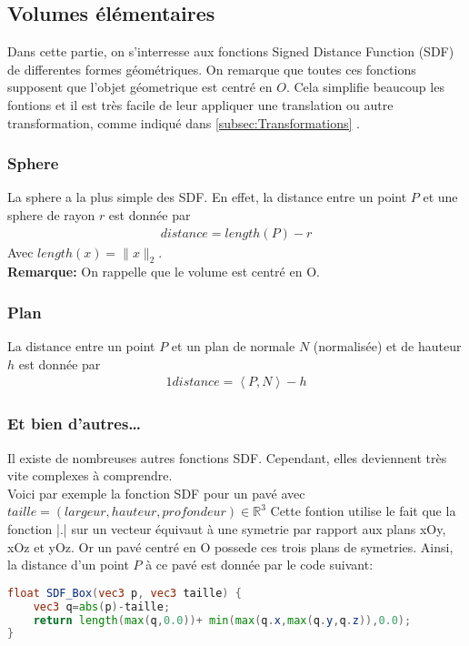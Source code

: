 \subsection{Volumes élémentaires}
Dans cette partie, on s'interresse aux fonctions Signed Distance Function (SDF) de differentes formes géométriques. On remarque que toutes ces fonctions supposent que l'objet géometrique est centré en $O$. Cela simplifie beaucoup les fontions et il est très facile de leur appliquer une translation ou autre transformation, comme indiqué dans \ref{subsec:Transformations} .
\subsubsection{Sphere}
La sphere a la plus simple des SDF. En effet, la distance entre un point $P$ et une sphere de rayon $r$ est donnée par 
\begin{align*}
distance=length(P)-r
\end{align*}
Avec $length(x)=\|x\|_2$.
\\\textbf{Remarque:} On rappelle que le volume est centré en O.
\subsubsection{Plan}
La distance entre un point $P$ et un plan de normale $N$ (normalisée) et de hauteur $h$ est donnée par 
\begin{alignat*}{1}
    distance=\left\langle P,N \right\rangle - h
\end{alignat*}
\subsubsection{Et bien d'autres\ldots}
Il existe de nombreuses autres fonctions SDF. Cependant, elles deviennent très vite complexes à comprendre.\\
Voici par exemple la fonction SDF pour un pavé avec $taille=(largeur, hauteur, profondeur) \in \mathbb{R}^3$
Cette fontion utilise le fait que la fonction |.| sur un vecteur équivaut à une symetrie par rapport aux plans xOy, xOz et yOz. Or un pavé centré en O possede ces trois plans de symetries. Ainsi, la distance d'un point $P$ à ce pavé est donnée par le code suivant:

\begin{lstlisting}[language=GLSL, title={SDF d'un pavé}]
float SDF_Box(vec3 p, vec3 taille) {
	vec3 q=abs(p)-taille;
	return length(max(q,0.0))+ min(max(q.x,max(q.y,q.z)),0.0);
}
\end{lstlisting}
